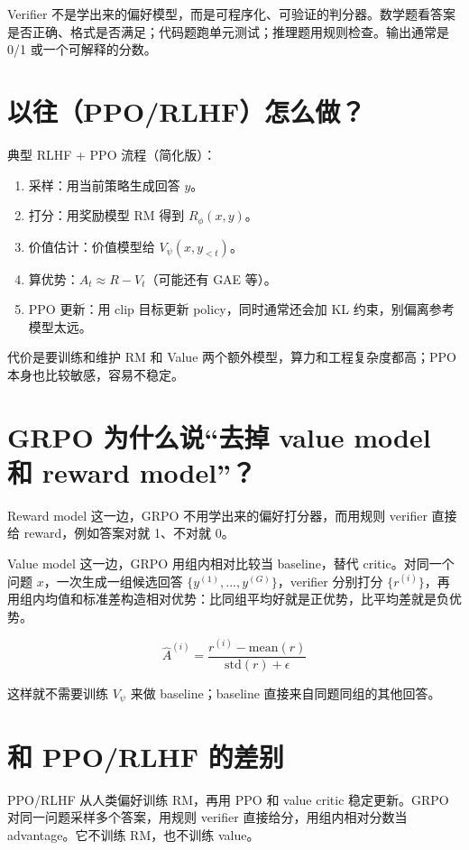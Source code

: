 Verifier 不是学出来的偏好模型，而是可程序化、可验证的判分器。数学题看答案是否正确、格式是否满足；代码题跑单元测试；推理题用规则检查。输出通常是 0/1 或一个可解释的分数。

\section{以往（PPO/RLHF）怎么做？}

典型 RLHF + PPO 流程（简化版）：

\begin{enumerate}
  \item 采样：用当前策略生成回答 \(y\)。
  \item 打分：用奖励模型 RM 得到 \(R_\phi(x,y)\)。
  \item 价值估计：价值模型给 \(V_\psi(x, y_{<t})\)。
  \item 算优势：\(A_t \approx R - V_t\)（可能还有 GAE 等）。
  \item PPO 更新：用 clip 目标更新 policy，同时通常还会加 KL 约束，别偏离参考模型太远。
\end{enumerate}

代价是要训练和维护 RM 和 Value 两个额外模型，算力和工程复杂度都高；PPO 本身也比较敏感，容易不稳定。

\section{GRPO 为什么说“去掉 value model 和 reward model”？}

Reward model 这一边，GRPO 不用学出来的偏好打分器，而用规则 verifier 直接给 reward，例如答案对就 1、不对就 0。

Value model 这一边，GRPO 用组内相对比较当 baseline，替代 critic。对同一个问题 \(x\)，一次生成一组候选回答 \(\{y^{(1)},...,y^{(G)}\}\)，verifier 分别打分 \(\{r^{(i)}\}\)，再用组内均值和标准差构造相对优势：比同组平均好就是正优势，比平均差就是负优势。

\[
\hat A^{(i)} = \frac{r^{(i)} - \text{mean}(r)}{\text{std}(r)+\epsilon}
\]

这样就不需要训练 \(V_\psi\) 来做 baseline；baseline 直接来自同题同组的其他回答。

\section{和 PPO/RLHF 的差别}

PPO/RLHF 从人类偏好训练 RM，再用 PPO 和 value critic 稳定更新。GRPO 对同一问题采样多个答案，用规则 verifier 直接给分，用组内相对分数当 advantage。它不训练 RM，也不训练 value。
